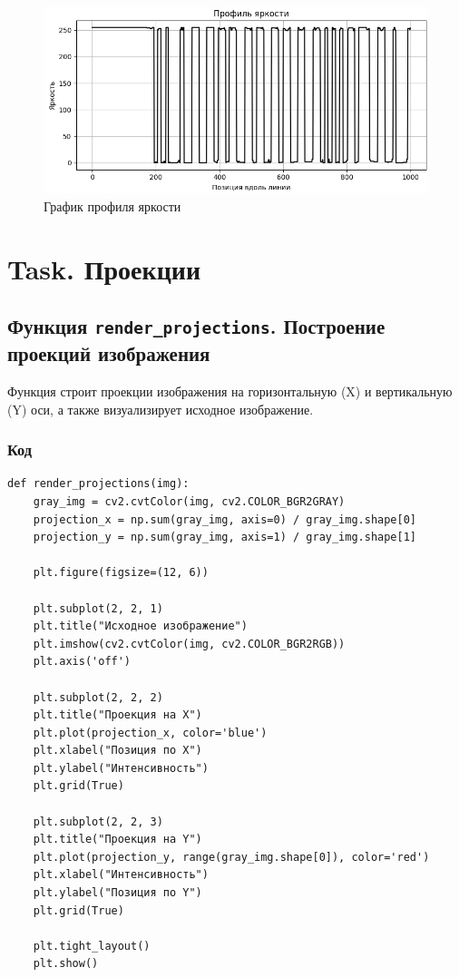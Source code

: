 \documentclass[a4paper,12pt]{article}
\begin{document}
\begin{figure}[H]
    \centering
    \includegraphics[width=1\textwidth]{im/imПрофильЯркости.png}
    \caption{График профиля яркости}
    \label{fig:brightness_profile}
\end{figure}















\section{Task. Проекции}

\subsection{Функция \texttt{render\_projections}. Построение проекций изображения}

Функция строит проекции изображения на горизонтальную (X) и вертикальную (Y) оси, а также визуализирует исходное изображение.

\subsubsection{Код}
\begin{verbatim}
def render_projections(img):
    gray_img = cv2.cvtColor(img, cv2.COLOR_BGR2GRAY)
    projection_x = np.sum(gray_img, axis=0) / gray_img.shape[0]
    projection_y = np.sum(gray_img, axis=1) / gray_img.shape[1]

    plt.figure(figsize=(12, 6))

    plt.subplot(2, 2, 1)
    plt.title("Исходное изображение")
    plt.imshow(cv2.cvtColor(img, cv2.COLOR_BGR2RGB))
    plt.axis('off')

    plt.subplot(2, 2, 2)
    plt.title("Проекция на X")
    plt.plot(projection_x, color='blue')
    plt.xlabel("Позиция по X")
    plt.ylabel("Интенсивность")
    plt.grid(True)

    plt.subplot(2, 2, 3)
    plt.title("Проекция на Y")
    plt.plot(projection_y, range(gray_img.shape[0]), color='red')
    plt.xlabel("Интенсивность")
    plt.ylabel("Позиция по Y")
    plt.grid(True)

    plt.tight_layout()
    plt.show()
\end{verbatim}
\end{document}
